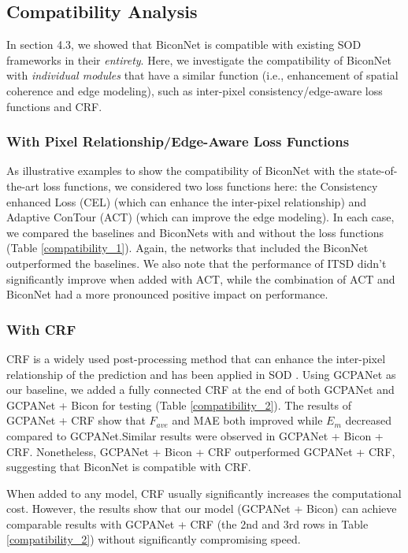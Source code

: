 \documentclass[review]{cvpr}
\begin{document}
\subsection{Compatibility Analysis}
In section 4.3, we showed that BiconNet is compatible with existing SOD frameworks in their \textit{entirety}. Here, we investigate the compatibility of BiconNet with \textit{individual modules} that have a similar function (i.e., enhancement of spatial coherence and edge modeling), such as inter-pixel consistency/edge-aware loss functions and CRF.

\subsubsection{With Pixel Relationship/Edge-Aware Loss Functions}
As illustrative examples to show the compatibility of BiconNet with the state-of-the-art loss functions, we considered two loss functions here: the Consistency enhanced Loss (CEL) \cite{MINet} (which can enhance the inter-pixel relationship) and Adaptive ConTour (ACT) \cite{ITSD} (which can improve the edge modeling). In each case, we compared the baselines and BiconNets with and without the loss functions (Table \ref{compatibility_1}). Again, the networks that included the BiconNet outperformed the baselines. We also note that the performance of ITSD didn’t significantly improve when added with ACT, while the combination of ACT and BiconNet had a more pronounced positive impact on performance. 




\subsubsection{With CRF}
CRF is a widely used post-processing method that can enhance the inter-pixel relationship of the prediction and has been applied in SOD \cite{picanet,DSS,crf2}. Using GCPANet as our baseline, we added a fully connected CRF at the end of both GCPANet and GCPANet + Bicon for testing (Table \ref{compatibility_2}). The results of GCPANet + CRF show that $F_{ave}$ and MAE both improved while $E_m$ decreased compared to GCPANet.Similar results were observed in GCPANet + Bicon + CRF. Nonetheless, GCPANet + Bicon + CRF outperformed GCPANet + CRF, suggesting that BiconNet is compatible with CRF. 

When added to any model, CRF usually significantly increases the computational cost. However, the results show that our model (GCPANet + Bicon) can achieve comparable results with GCPANet + CRF (the 2nd and 3rd rows in Table \ref{compatibility_2}) without significantly compromising speed. 
\end{document}
